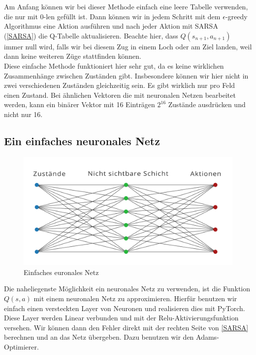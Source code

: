 Am Anfang können wir bei dieser Methode einfach eine leere Tabelle verwenden, die nur mit 0-len gefüllt ist. Dann können wir in jedem Schritt mit dem $\epsilon$-greedy Algorithmus eine Aktion ausführen und nach jeder Aktion mit SARSA (\ref{SARSA}) die Q-Tabelle aktualisieren. Beachte hier, dass $Q(s_{n+1}, a_{n+1})$ immer null wird, falls wir bei diesem Zug in einem Loch oder am Ziel landen, weil dann keine weiteren Züge stattfinden können. \\

Diese einfache Methode funktioniert hier sehr gut, da es keine wirklichen Zusammenhänge zwischen Zuständen gibt. Insbesondere können wir hier nicht in zwei verschiedenen Zuständen gleichzeitig sein. Es gibt wirklich nur pro Feld einen Zustand. Bei ähnlichen Vektoren die mit neuronalen Netzen bearbeitet werden, kann ein binärer Vektor mit 16 Einträgen $2^{16}$ Zustände ausdrücken und nicht nur 16. \\

\subsection{Ein einfaches neuronales Netz}
\label{subsec:dn}

\begin{figure}[hbt!]
\centering
\includegraphics[width=\textwidth]{Figures/dn.png}
\caption{Einfaches euronales Netz}
\label{police}
\end{figure}

Die naheliegenste Möglichkeit ein neuronales Netz zu verwenden, ist die Funktion $Q(s, a)$ mit einem neuronalen Netz zu approximieren. Hierfür benutzen wir einfach einen versteckten Layer von Neuronen und realisieren dies mit PyTorch. Diese Layer werden Linear verbunden und mit der Relu-Aktivierungsfunktion versehen. Wir können dann den Fehler direkt mit der rechten Seite von \ref{SARSA} berechnen und an das Netz übergeben. Dazu benutzen wir den Adams-Optimierer.

